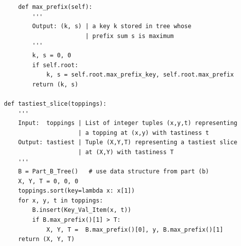 \documentclass[12pt,twoside]{article}
\begin{document}
\begin{problems}
\begin{problemparts}
\begin{lstlisting}
    def max_prefix(self):
        '''
        Output: (k, s) | a key k stored in tree whose
                       | prefix sum s is maximum
        '''
        k, s = 0, 0
        if self.root:
            k, s = self.root.max_prefix_key, self.root.max_prefix
        return (k, s)

def tastiest_slice(toppings):
    '''
    Input:  toppings | List of integer tuples (x,y,t) representing 
                     | a topping at (x,y) with tastiness t
    Output: tastiest | Tuple (X,Y,T) representing a tastiest slice 
                     | at (X,Y) with tastiness T
    '''
    B = Part_B_Tree()   # use data structure from part (b)
    X, Y, T = 0, 0, 0
    toppings.sort(key=lambda x: x[1])
    for x, y, t in toppings:
        B.insert(Key_Val_Item(x, t))
        if B.max_prefix()[1] > T:
            X, Y, T =  B.max_prefix()[0], y, B.max_prefix()[1]
    return (X, Y, T)
  \end{lstlisting}
\end{problemparts}

\end{problems}
\end{document}
